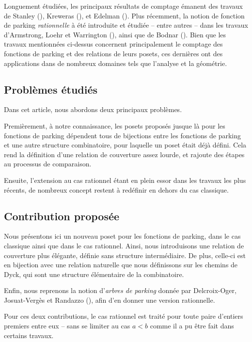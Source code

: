 \documentclass[11pt]{article}
\theoremstyle{remark}
\theoremstyle{definition}
\begin{document}
Longuement étudiées, les principaux résultats de comptage émanent des
travaux de Stanley (\cite{ref2, ref3}), Kreweras (\cite{ref4}),
et Edelman (\cite{ref5}).
Plus récemment, la notion de fonction de parking \emph{rationnelle} à été
introduite et étudiée -- entre autres -- dans les travaux d'Armstrong, Loehr
et Warrington (\cite{ref7}), ainsi que de Bodnar (\cite{ref8}).
Bien que les travaux mentionnées ci-dessus concernent principalement le
comptage des fonctions de parking et des relations de leurs posets, 
ces dernières ont des applications dans de nombreux domaines tels que
l'analyse et la géométrie.

\subsection*{Problèmes étudiés}

Dans cet article, nous abordons deux principaux problèmes.

Premièrement, à notre connaissance, les posets proposés jusque là pour
les fonctions de parking dépendent tous de bijections entre les fonctions
de parking et une autre structure combinatoire, pour laquelle un poset
était déjà défini. Cela rend la définition d'une relation de couverture
assez lourde, et rajoute des étapes au processus de comparaison.

Ensuite, l'extension au cas rationnel étant en plein essor dans les travaux
les plus récents, de nombreux concept restent à redéfinir en dehors du cas
classique.

\subsection*{Contribution proposée}
Nous présentons ici un nouveau poset pour les fonctions de
parking, dans le cas classique ainsi que dans le cas rationnel.
Ainsi, nous introduisons une relation de couverture plus élégante,
définie sans structure intermédiaire.
De plus, celle-ci est en bijection avec une relation naturelle que nous
définissons sur les chemins de Dyck, qui sont une structure élémentaire
de la combinatoire.

Enfin, nous reprenons la notion d'\emph{arbres de parking} donnée par
Delcroix-Oger, Josuat-Vergès et Randazzo (\cite{ref9}), afin d'en donner
une version rationnelle.

Pour ces deux contributions, le cas rationnel est traité pour toute paire
d'entiers premiers entre eux -- sans se limiter au cas $a < b$ comme il a
pu être fait dans certains travaux.
\end{document}
